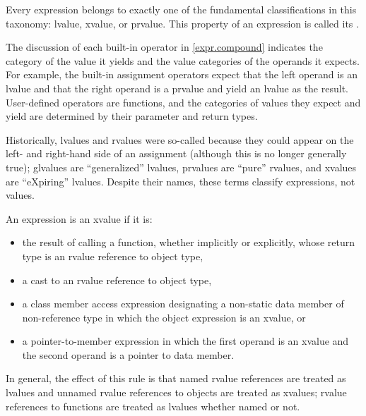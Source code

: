 \pnum
Every expression belongs to exactly one of the fundamental classifications in this
taxonomy: lvalue, xvalue, or prvalue. This property of an expression is called
its . \begin{note} The discussion of each built-in operator in
\ref{expr.compound} indicates the category of the value it yields and the value categories
of the operands it expects. For example, the built-in assignment operators expect that
the left operand is an lvalue and that the right operand is a prvalue and yield an
lvalue as the result. User-defined operators are functions, and the categories of
values they expect and yield are determined by their parameter and return types. \end{note}

\pnum
\begin{note}
Historically, lvalues and rvalues were so-called
because they could appear on the left- and right-hand side of an assignment
(although this is no longer generally true);
glvalues are ``generalized'' lvalues,
prvalues are ``pure'' rvalues,
and xvalues are ``eXpiring'' lvalues.
Despite their names, these terms classify expressions, not values.
\end{note}

\pnum
{}%
\begin{note}
An expression is an xvalue if it is:
\begin{itemize}
\item the result of calling a function, whether implicitly or explicitly,
whose return type is an rvalue reference to object type,

\item a cast to an rvalue reference to object type,

\item a class member access expression designating a non-static data member
of non-reference type
in which the object expression is an xvalue, or

\item a  pointer-to-member expression in which the first operand is
an xvalue and the second operand is a pointer to data member.
\end{itemize}
In general, the effect of this rule is that named rvalue references are
treated as lvalues and unnamed rvalue references to objects are treated as
xvalues; rvalue references to functions are treated as lvalues whether named or not.
\end{note}

